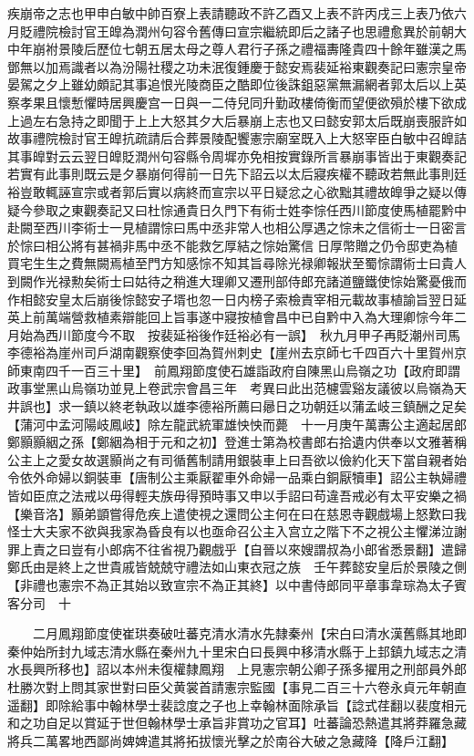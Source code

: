 疾崩帝之志也甲申白敏中帥百寮上表請聽政不許乙酉又上表不許丙戌三上表乃依六月貶禮院檢討官王皥為潤州句容令舊傳曰宣宗繼統即后之諸子也思禮愈異於前朝大中年崩袝景陵后歷位七朝五居太母之尊人君行子孫之禮福夀隆貴四十餘年雖漢之馬鄧無以加焉識者以為汾陽社稷之功未泯復鍾慶于懿安焉裴延裕東觀奏記曰憲宗皇帝晏駕之夕上雖幼頗記其事追恨光陵商臣之酷即位後誅鉏惡黨無漏網者郭太后以上英察孝果且懷慙懼時居興慶宫一日與一二侍兒同升勤政樓倚衡而望便欲殞於樓下欲成上過左右急持之即聞于上上大怒其夕大后暴崩上志也又曰懿安郭太后既崩喪服許如故事禮院檢討官王皥抗疏請后合葬景陵配饗憲宗廟室既入上大怒宰臣白敏中召皥詰其事皥對云云翌日皥貶潤州句容縣令周墀亦免相按實錄所言暴崩事皆出于東觀奏記若實有此事則既云是夕暴崩何得前一日先下詔云以太后寢疾權不聽政若無此事則廷裕豈敢輒誣宣宗或者郭后實以病終而宣宗以平日疑忿之心欲黜其禮故皥爭之疑以傳疑今參取之東觀奏記又曰杜悰通貴日久門下有術士姓李悰任西川節度使馬植罷黔中赴闕至西川李術士一見植謂悰曰馬中丞非常人也相公厚遇之悰未之信術士一日密言於悰曰相公將有甚禍非馬中丞不能救乞厚結之悰始驚信日厚幣贈之仍令邸吏為植買宅生生之費無闕焉植至門方知感悰不知其旨尋除光禄卿報狀至蜀悰謂術士曰貴人到闕作光禄勲矣術士曰姑待之稍進大理卿又遷刑部侍郎充諸道鹽鐵使悰始驚憂俄而作相懿安皇太后崩後悰懿安子壻也忽一日内榜子索檢責宰相元載故事植諭旨翌日延英上前萬端營救植素辯能回上旨事遂中寢按植會昌中已自黔中入為大理卿悰今年二月始為西川節度今不取　按裴延裕後作廷裕必有一誤】　秋九月甲子再貶潮州司馬李德裕為崖州司戶湖南觀察使李回為賀州刺史【崖州去京師七千四百六十里賀州京師東南四千一百三十里】　前鳳翔節度使石雄詣政府自陳黑山烏嶺之功【政府即謂政事堂黑山烏嶺功並見上卷武宗會昌三年　考異曰此出范櫖雲谿友議彼以烏嶺為天井誤也】求一鎮以終老執政以雄李德裕所薦曰曏日之功朝廷以蒲孟岐三鎮酬之足矣【蒲河中孟河陽岐鳳岐】除左龍武統軍雄怏怏而薨　十一月庚午萬夀公主適起居郎鄭顥顥絪之孫【鄭絪為相于元和之初】登進士第為校書郎右拾遺内供奉以文雅著稱公主上之愛女故選顥尚之有司循舊制請用銀裝車上曰吾欲以儉約化天下當自親者始令依外命婦以銅裝車【唐制公主乘厭翟車外命婦一品乘白銅厭犢車】詔公主執婦禮皆如臣庶之法戒以毋得輕夫族毋得預時事又申以手詔曰苟違吾戒必有太平安樂之禍【樂音洛】顥弟顗嘗得危疾上遣使視之還問公主何在曰在慈恩寺觀戲場上怒歎曰我怪士大夫家不欲與我家為昏良有以也亟命召公主入宫立之階下不之視公主懼涕泣謝罪上責之曰豈有小郎病不往省視乃觀戲乎【自晉以來嫂謂叔為小郎省悉景翻】遣歸鄭氏由是終上之世貴戚皆兢兢守禮法如山東衣冠之族　壬午葬懿安皇后於景陵之側【非禮也憲宗不為正其始以致宣宗不為正其終】以中書侍郎同平章事韋琮為太子賓客分司　十

　　二月鳳翔節度使崔珙奏破吐蕃克清水清水先隸秦州【宋白曰清水漢舊縣其地即秦仲始所封九域志清水縣在秦州九十里宋白曰長興中移清水縣于上邽鎮九域志之清水長興所移也】詔以本州未復權隸鳳翔　上見憲宗朝公卿子孫多擢用之刑部員外郎杜勝次對上問其家世對曰臣父黄裳首請憲宗監國【事見二百三十六卷永貞元年朝直遥翻】即除給事中翰林學士裴諗度之子也上幸翰林面除承旨【諗式荏翻以裴度相元和之功自足以賞延于世但翰林學士承旨非賞功之官耳】吐蕃論恐熱遣其將莽羅急藏將兵二萬畧地西鄙尚婢婢遣其將拓拔懷光擊之於南谷大破之急藏降【降戶江翻】

